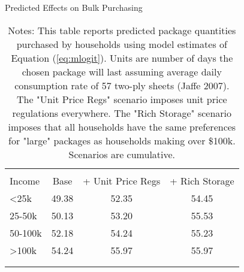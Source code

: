 \begin{table}[!htbp] \centering
\caption{Predicted Effects on Bulk Purchasing}
\label{tab:counterfactualMNLDays}
\begin{tabular}{lccc}
\\[-1.8ex]\hline
\hline \\[-1.8ex]
Income   & Base    & + Unit Price Regs   &  + Rich Storage  \\
\hline
<25k     & 49.38   & 52.35             & 54.45 \\
25-50k   & 50.13   & 53.20              & 55.53 \\
50-100k  & 52.18   & 54.24              & 55.23 \\
>100k    & 54.24   & 55.97              & 55.97 \\
\\[-1.8ex]\hline
\hline \\[-1.8ex]
\end{tabular}
\caption*{Notes: This table reports predicted package quantities purchased by households using model estimates of Equation (\ref{eq:mlogit}). Units are number of days the chosen package will last assuming average daily consumption rate of 57 two-ply sheets (Jaffe 2007). The "Unit Price Regs" scenario imposes unit price regulations everywhere. The "Rich Storage" scenario imposes that all households have the same preferences for "large" packages as households making over \$100k. Scenarios are cumulative.}
\end{table}
